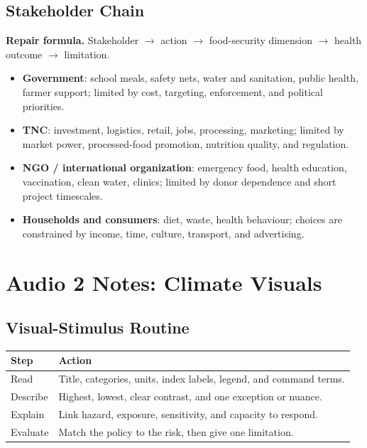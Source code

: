 \documentclass[11pt,a4paper]{article}
\newcommand{\term}[1]{\textcolor{HeadingBlue}{\textbf{#1}}}
\newcommand{\boxnote}[3]{%
\noindent\colorbox{#1}{%
  \begin{minipage}{0.965\textwidth}
  \sffamily
  \textbf{\textcolor{HeadingBlue}{#2}} #3
  \end{minipage}
}}
\begin{document}
\subsection{Stakeholder Chain}

\boxnote{SoftGreen}{Repair formula.}{Stakeholder $\rightarrow$ action
$\rightarrow$ food-security dimension $\rightarrow$ health outcome
$\rightarrow$ limitation.}

\begin{itemize}
  \item \term{Government}: school meals, safety nets, water and sanitation,
  public health, farmer support; limited by cost, targeting, enforcement, and
  political priorities.
  \item \term{TNC}: investment, logistics, retail, jobs, processing, marketing;
  limited by market power, processed-food promotion, nutrition quality, and
  regulation.
  \item \term{NGO / international organization}: emergency food, health
  education, vaccination, clean water, clinics; limited by donor dependence and
  short project timescales.
  \item \term{Households and consumers}: diet, waste, health behaviour; choices
  are constrained by income, time, culture, transport, and advertising.
\end{itemize}

\section{Audio 2 Notes: Climate Visuals}

\subsection{Visual-Stimulus Routine}

\begin{tabularx}{\textwidth}{L{0.18\textwidth}Y}
\toprule
\textbf{Step} & \textbf{Action} \\
\midrule
Read & Title, categories, units, index labels, legend, and command terms. \\
Describe & Highest, lowest, clear contrast, and one exception or nuance. \\
Explain & Link hazard, exposure, sensitivity, and capacity to respond. \\
Evaluate & Match the policy to the risk, then give one limitation. \\
\bottomrule
\end{tabularx}
\end{document}
